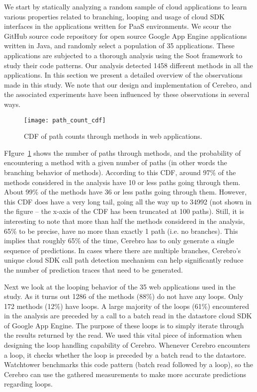 We start by statically analyzing a random sample of cloud applications to learn various properties related
to branching, looping and usage of cloud SDK interfaces in the applications written for PaaS environments. 
We scour the GitHub source code repository for open source Google App Engine applications written in Java,
and randomly select a population of 35 applications. These applications are subjected to a thorough analysis
using the Soot framework to study their code patterns. Our analysis detected 1458 different methods in all the
applications. In this section we present a detailed overview of the observations made in this study. We note that
our design and implementation of Cerebro, and the associated experiments have been influenced by 
these observations in several ways.

\begin{figure}
\centering
\texttt{[image: path\_count\_cdf]}
\caption{CDF of path counts through methods in web applications.}
\label{fig:path_count_cdf}
\end{figure}

FIgure~\ref{fig:path_count_cdf} shows the number of paths through methods, and the probability of encountering
a method with a given number of paths (in other words the branching behavior of methods). According to this CDF, 
around 97\% of the methods considered in the analysis have 10 or less paths going through them. About 99\% of 
the methods have 36 or less paths going through them. However, this CDF does have a very long tail, going all the way
up to 34992 (not shown in the figure -- the x-axis of the CDF has been truncated at 100 paths). Still, it is interesting to note that more
than half the methods considered in the analysis, 65\% to be precise, have no more than exactly 1 path (i.e. no branches).
This implies that roughly 65\% of the time, Cerebro has to only generate a single sequence of predictions. In cases
where there are multiple branches, Cerebro's unique cloud SDK call path detection mechanism can help significantly 
reduce the number of prediction traces that need to be generated.

Next we look at the looping behavior of the 35 web applications used in the study. As it turns out 1286 of the methods (88\%)
do not have any loops. Only 172 methods (12\%) have loops. A large majority of the loops (61\%) encountered in the analysis are
preceded by a call to a batch read in the datastore cloud SDK of Google App Engine. The purpose of these loops is to simply iterate
through the results returned by the read. We used this vital piece of information when designing the loop handling capability of
Cerebro. Whenever Cerebro encounters a loop, it checks whether the loop is preceded by a batch read to the datastore. Watchtower
benchmarks this code pattern (batch read followed by a loop), so the Cerebro can use the gathered measurements to make
more accurate predictions regarding loops.


